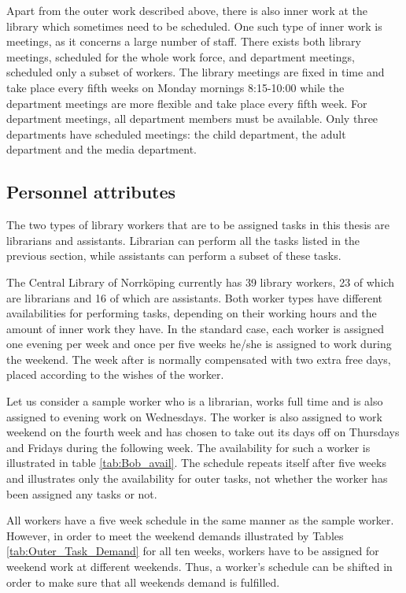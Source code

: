 Apart from the outer work described above, there is also inner work at the library which sometimes need to be scheduled. One such type of inner work is meetings, as it concerns a large number of staff. There exists both library meetings, scheduled for the whole work force, and department meetings, scheduled only a subset of workers. The library meetings are fixed in time and take place every fifth weeks on Monday mornings 8:15-10:00 while the department meetings are more flexible and take place every fifth week. For department meetings, all department members must be available. Only three departments have scheduled meetings: the child department, the adult department and the media department.

\subsection{Personnel attributes}

The two types of library workers that are to be assigned tasks in this thesis are librarians and assistants. Librarian can perform all the tasks listed in the previous section, while assistants can perform a subset of these tasks.

The Central Library of Norrköping currently has 39 library workers, 23 of which are librarians and 16 of which are assistants. Both worker types have different availabilities for performing tasks, depending on their working hours and the amount of inner work they have. In the standard case, each worker is assigned one evening per week and once per five weeks he/she is assigned to work during the weekend. The week after is normally compensated with two extra free days, placed according to the wishes of the worker.

Let us consider a sample worker who is a librarian, works full time and is also assigned to evening work on Wednesdays. The worker is also assigned to work weekend on the fourth week and has chosen to take out its days off on Thursdays and Fridays during the following week. The availability for such a worker is illustrated in table \ref{tab:Bob_avail}. The schedule repeats itself after five weeks and illustrates only the availability for outer tasks, not whether the worker has been assigned any tasks or not.

All workers have a five week schedule in the same manner as the sample worker. However, in order to meet the weekend demands illustrated by Tables \ref{tab:Outer_Task_Demand} for all ten weeks, workers have to be assigned for weekend work at different weekends. Thus, a worker's schedule can be shifted in order to make sure that all weekends demand is fulfilled.

